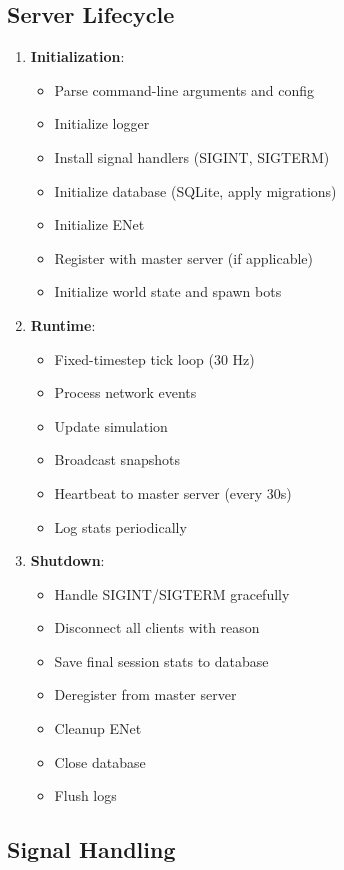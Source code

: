 \documentclass[11pt]{article}
\begin{document}
\subsection{Server Lifecycle}

\begin{enumerate}
  \item \textbf{Initialization}:
    \begin{itemize}
      \item Parse command-line arguments and config
      \item Initialize logger
      \item Install signal handlers (SIGINT, SIGTERM)
      \item Initialize database (SQLite, apply migrations)
      \item Initialize ENet
      \item Register with master server (if applicable)
      \item Initialize world state and spawn bots
    \end{itemize}
  \item \textbf{Runtime}:
    \begin{itemize}
      \item Fixed-timestep tick loop (30 Hz)
      \item Process network events
      \item Update simulation
      \item Broadcast snapshots
      \item Heartbeat to master server (every 30s)
      \item Log stats periodically
    \end{itemize}
  \item \textbf{Shutdown}:
    \begin{itemize}
      \item Handle SIGINT/SIGTERM gracefully
      \item Disconnect all clients with reason
      \item Save final session stats to database
      \item Deregister from master server
      \item Cleanup ENet
      \item Close database
      \item Flush logs
    \end{itemize}
\end{enumerate}

\subsection{Signal Handling}
\end{document}
